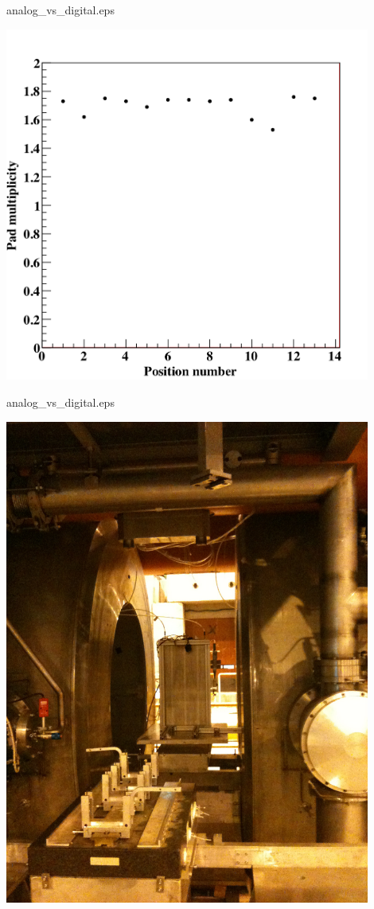 \documentclass[10pt]{beamer}
\begin{document}
\begin{frame}{analog\_vs\_digital.eps}
    \centerline{\includegraphics[width=0.9\textwidth]{images/Test1m2Multiplicity}}
\end{frame}
\begin{frame}{analog\_vs\_digital.eps}
    \centerline{\includegraphics[width=0.9\textwidth]{images/PowerPulsingPhoto}}
\end{frame}
\end{document}
